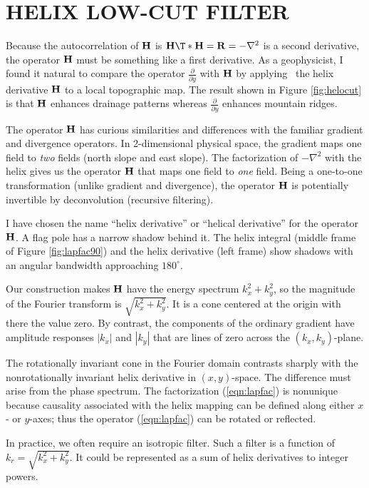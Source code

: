 \section{HELIX LOW-CUT FILTER}
Because the autocorrelation of $\bold H$ is
$\bold H\T \ast \bold H = \bold R =-\nabla^2$
is a second derivative,
the operator $\bold H$ must be something like a first derivative.
As a geophysicist, I found it natural to compare
the operator $\frac{\partial}{\partial y}$
with $\bold H$ by applying \
the helix derivative $\bold H$
to a local topographic map.
The result shown in
Figure \ref{fig:helocut}
is that $\bold H$ enhances drainage patterns whereas
$\frac{\partial}{\partial y}$ enhances mountain ridges.
\par
The operator $\bold H$ has
curious similarities and differences
with the familiar gradient and divergence operators.
In 2-dimensional physical space,
the gradient maps one field to {\em two} fields
(north slope and east slope).
The factorization of $-\nabla^2$ with the helix
gives us the operator $\bold H$
that maps one field to {\em  one} field.
Being a one-to-one transformation
(unlike gradient and divergence),
the operator $\bold H$ is potentially invertible
by deconvolution (recursive filtering).
\par
I have chosen the name
``helix derivative''
or ``helical derivative'' for the operator $\bold H$.
A flag pole has a narrow shadow behind it.
The helix integral (middle frame of Figure \ref{fig:lapfac90})
and the helix derivative (left frame)
show shadows with an angular bandwidth approaching $180^\circ$.
\par
Our construction makes $\bold H$ have the energy spectrum $k_x^2+k_y^2$,
so the magnitude of the Fourier transform is $\sqrt{k_x^2+k_y^2}$.
It is a cone
centered at the origin with there the value zero.
By contrast, the components of the ordinary gradient
have amplitude responses $|k_x|$ and $|k_y|$
that are lines of zero across the
$(k_x,k_y)$-plane.
\par
The rotationally invariant cone in the Fourier domain
contrasts sharply with the nonrotationally invariant
helix derivative in $(x,y)$-space.
The difference must arise from the phase spectrum.
The factorization (\ref{eqn:lapfac})
is nonunique because causality
associated with the helix mapping
can be defined along either $x$- or $y$-axes;
thus the operator 
(\ref{eqn:lapfac})
can be rotated or reflected.
\par
In practice, we often require an isotropic filter.
Such a filter is a function of $k_r=\sqrt{k_x^2 + k_y^2}$.
It could be represented as a sum of helix derivatives to integer powers.


